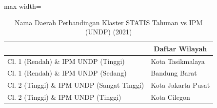 \begin{table}[H]
\centering
\caption{Nama Daerah Perbandingan Klaster STATIS Tahunan vs IPM (UNDP) (2021)} \label{tab:sample2statis_ipm_name_2021}
\begin{adjustbox}{max width=\textwidth}
\begin{tabular}{|>{\centering\arraybackslash}p{4cm}|p{10cm}|}
\hline
\multicolumn{1}{|c|}{\textbf{Kategori}} & \multicolumn{1}{c|}{\textbf{Daftar Wilayah}} \\
\hline
Cl. 1 (Rendah) \& IPM UNDP (Tinggi) & Kota Tasikmalaya \\
\hline
Cl. 1 (Rendah) \& IPM UNDP (Sedang) & Bandung Barat \\
\hline
Cl. 2 (Tinggi) \& IPM UNDP (Sangat Tinggi) & Kota Jakarta Pusat \\
\hline
Cl. 2 (Tinggi) \& IPM UNDP (Tinggi) & Kota Cilegon \\
\hline
\end{tabular}
\end{adjustbox}
\end{table}